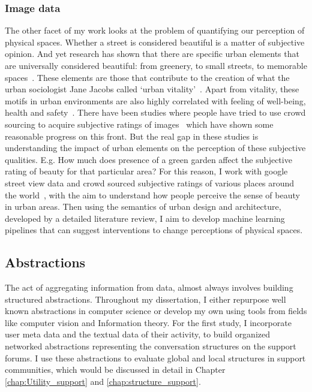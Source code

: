 \subsubsection{Image data}
The other facet of my work looks at the problem of quantifying our perception of physical spaces. Whether a street is considered beautiful is a matter of subjective opinion. And yet research has shown that there are specific urban elements that are universally considered beautiful: from greenery, to small streets, to memorable spaces~\cite{alexander1977pattern, quercia2014aesthetic,salesses2013collaborative}. These elements are those that contribute to the creation of what the urban sociologist Jane Jacobs called `urban vitality'~\cite{jacobs1961death}. Apart from vitality, these motifs in urban environments are also highly correlated with feeling of well-being, health and safety~\cite{kaplan1989experience}. There have been studies where people have tried to use crowd sourcing to acquire subjective ratings of images~\cite{seresinhe2015quantifying} which have shown some reasonable progress on this front. But the real gap in these studies is understanding the impact of urban elements on the perception of these subjective qualities. E.g. How much does presence of a green garden affect the subjective rating of beauty for that particular area? For this reason, I work with google street view data and crowd sourced subjective ratings of various places around the world~\cite{naik2014streetscore}, with the aim to understand how people perceive the sense of beauty in urban areas. Then using the semantics of urban design and architecture, developed by a detailed literature review, I aim to develop machine learning pipelines that can suggest interventions to change perceptions of physical spaces.

\subsection{Abstractions}
The act of aggregating information from data, almost always involves building structured abstractions. Throughout my dissertation, I either repurpose well known abstractions in computer science or develop my own using tools from fields like computer vision and Information theory. For the first study, I incorporate user meta data and the textual data of their activity, to build organized networked abstractions representing the conversation structures on the support forums. I use these abstractions to evaluate global and local structures in support communities, which would be discussed in detail in Chapter \ref{chap:Utility_support} and \ref{chap:structure_support}. 
  
